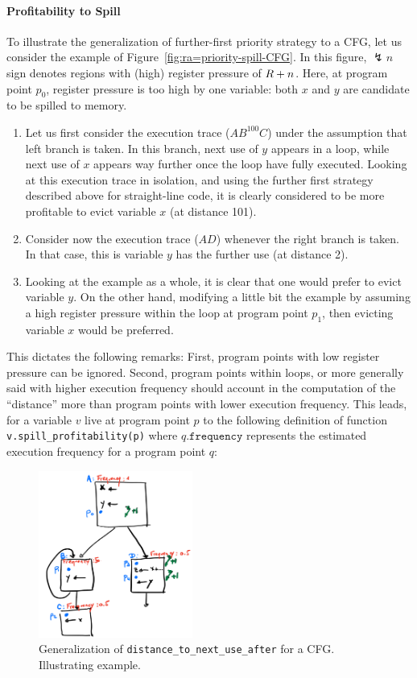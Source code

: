 {\paragraph{Profitability to Spill}
To illustrate the generalization of further-first priority strategy to a CFG, let us consider the example of Figure~\ref{fig:ra=priority-spill-CFG}.
In this figure, $\lightning n$ sign denotes regions with (high) register pressure of $R+n$.
Here, at program point $p_0$, register pressure is too high by one variable:
both $x$ and $y$ are candidate to be spilled to memory.
\begin{enumerate}
\item Let us first consider the execution trace ($AB^{100}C$) under the assumption that left branch is taken. 
  In this branch, next use of $y$ appears in a loop, while next use of $x$ appears way further once the loop have fully executed. 
  Looking at this execution trace in isolation, and using the further first strategy described above for straight-line code, it is clearly considered to be more profitable to evict variable $x$ (at distance 101).
\item Consider now the execution trace ($AD$) whenever the right branch is taken. In that case, this is variable $y$ has the further use (at distance 2).
\item Looking at the example as a whole, it is clear that one would prefer to evict variable $y$. 
  On the other hand, modifying a little bit the example by assuming a high register pressure within the loop at program point $p_1$, then evicting variable $x$ would be preferred.
\end{enumerate}
This dictates the following remarks:
First, program points with low register pressure can be ignored.
Second, program points within loops, or more generally said with higher execution frequency should account in the computation of the ``distance'' more than program points with lower execution frequency.
%
This leads, for a variable $v$ live at program point $p$ to the following definition of function \verb+v.spill_profitability(p)+ where $q.\texttt{frequency}$ represents the estimated execution frequency for a program point $q$:

\begin{figure}
  \includegraphics[width=0.45\textwidth]{figures/priority-spill-CFG.pdf}
  \caption{\label{fig:ra:priority-spill-CFG}Generalization of \texttt{distance\_to\_next\_use\_after} for a CFG. Illustrating example.}
\end{figure}

}
